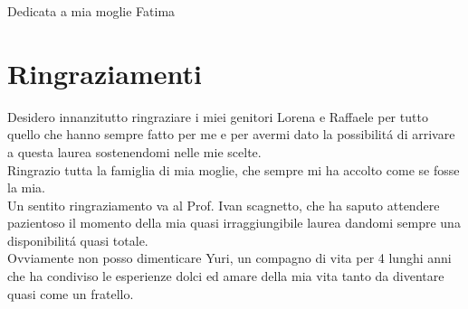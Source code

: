 Dedicata a mia moglie Fatima\\

\chapter{Ringraziamenti}
Desidero innanzitutto ringraziare i miei genitori Lorena e Raffaele per tutto quello che hanno sempre fatto per me e per avermi dato la possibilit\'a di arrivare a questa laurea sostenendomi nelle mie scelte.\\
Ringrazio tutta la famiglia di mia moglie, che sempre mi ha accolto come se fosse la mia.\\
Un sentito ringraziamento va al Prof. Ivan scagnetto, che ha saputo attendere pazientoso il momento della mia quasi irraggiungibile laurea dandomi sempre una disponibilit\'a quasi totale.\\
Ovviamente non posso dimenticare Yuri, un compagno di vita per 4 lunghi anni che ha condiviso le esperienze dolci ed amare della mia vita tanto da diventare quasi come un fratello.
